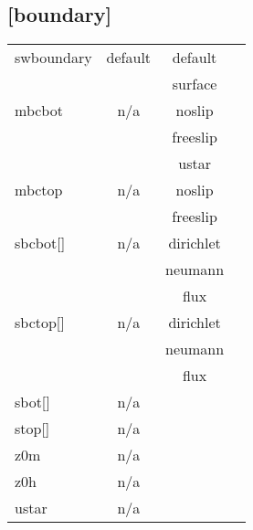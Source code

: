 \documentclass[a4paper,10pt]{extarticle}
\begin{document}
\subsection*{[boundary]}
\tablelasttail{\hline}
\begin{supertabular}{lccl}
swboundary    & default & default & \\
              &         & surface & \\
mbcbot        & n/a     & noslip \\
              &         & freeslip \\
              &         & ustar \\
mbctop        & n/a     & noslip \\
              &         & freeslip \\
sbcbot[]      & n/a     & dirichlet \\
              &         & neumann \\
              &         & flux \\
sbctop[]      & n/a     & dirichlet \\
              &         & neumann \\
              &         & flux \\
sbot[]        & n/a     & \\
stop[]        & n/a     & \\
z0m           & n/a     & \\
z0h           & n/a     & \\
ustar         & n/a     & \\
\end{supertabular}
\end{document}
